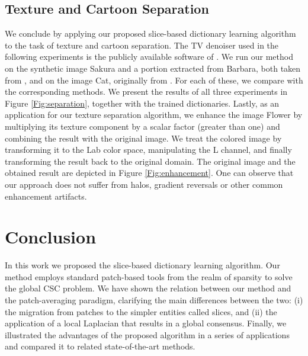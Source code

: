 \documentclass[10pt,twocolumn,letterpaper]{article}
\begin{document}
\subsection{Texture and Cartoon Separation}
We conclude by applying our proposed slice-based dictionary learning algorithm to the task of texture and cartoon separation. The TV denoiser used in the following experiments is the publicly available software of \cite{chan2011augmented}. We run our method on the synthetic image \textsf{\small{Sakura}} and a portion extracted from \textsf{\small{Barbara}}, both taken from \cite{ono2014cartoon}, and on the image \textsf{\small{Cat}}, originally from \cite{zhangconvolutional}. For each of these, we compare with the corresponding methods. We present the results of all three experiments in Figure \ref{Fig:separation}, together with the trained dictionaries. Lastly, as an application for our texture separation algorithm, we enhance the image \textsf{\small{Flower}} by multiplying its texture component by a scalar factor (greater than one) and combining the result with the original image. We treat the colored image by transforming it to the Lab color space, manipulating  the L channel, and finally transforming the result back to the original domain. The original image and the obtained result are depicted in Figure \ref{Fig:enhancement}. One can observe that our approach does not suffer from halos, gradient reversals or other common enhancement artifacts.

\vspace{-0.1cm}

\section{Conclusion} \label{Sec:conclusion}
In this work we proposed the slice-based dictionary learning algorithm. Our method employs standard patch-based tools from the realm of sparsity to solve the global CSC problem. We have shown the relation between our method and the patch-averaging paradigm, clarifying the main differences between the two: (i) the migration from patches to the simpler entities called slices, and (ii) the application of a local Laplacian that results in a global consensus. Finally, we illustrated the advantages of the proposed algorithm in a series of applications and compared it to related state-of-the-art methods.

\newpage


{\small


}
\end{document}
